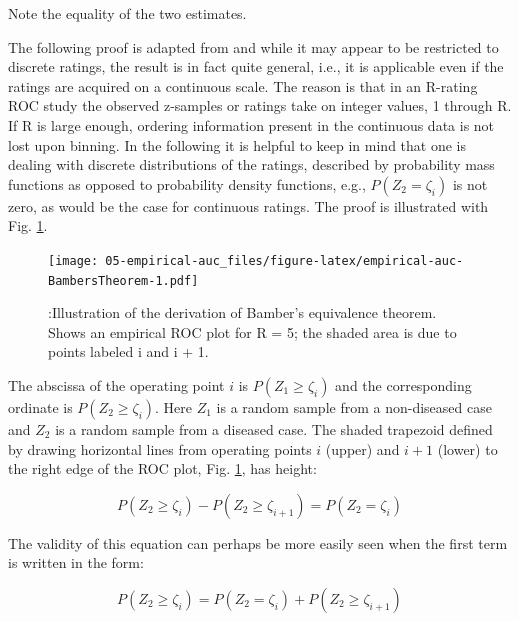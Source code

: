 \documentclass[
]{book}
\begin{document}
Note the equality of the two estimates.

The following proof is adapted from \citep{RN2174} and while it may appear to be restricted to discrete ratings, the result is in fact quite general, i.e., it is applicable even if the ratings are acquired on a continuous scale. The reason is that in an R-rating ROC study the observed z-samples or ratings take on integer values, 1 through R. If R is large enough, ordering information present in the continuous data is not lost upon binning. In the following it is helpful to keep in mind that one is dealing with discrete distributions of the ratings, described by probability mass functions as opposed to probability density functions, e.g., \(P(Z_2 = \zeta_i)\) is not zero, as would be the case for continuous ratings. The proof is illustrated with Fig. \ref{fig:empirical-auc-BambersTheorem}.

\begin{figure}
\centering
\texttt{[image: 05-empirical-auc\_files/figure-latex/empirical-auc-BambersTheorem-1.pdf]}
\caption{\label{fig:empirical-auc-BambersTheorem}:Illustration of the derivation of Bamber's equivalence theorem. Shows an empirical ROC plot for R = 5; the shaded area is due to points labeled i and i + 1.}
\end{figure}

The abscissa of the operating point \(i\) is \(P(Z_1 \geq \zeta_i)\) and the corresponding ordinate is \(P(Z_2 \geq \zeta_i)\). Here \(Z_1\) is a random sample from a non-diseased case and \(Z_2\) is a random sample from a diseased case. The shaded trapezoid defined by drawing horizontal lines from operating points \(i\) (upper) and \(i+1\) (lower) to the right edge of the ROC plot, Fig. \ref{fig:empirical-auc-BambersTheorem}, has height:

\begin{equation}
P\left ( Z_2 \geq \zeta_i \right ) - P\left ( Z_2 \geq \zeta_{i+1} \right ) = P\left ( Z_2 = \zeta_i \right )
\label{eq:empirical-auc-BambersTheoremProof1}
\end{equation}

The validity of this equation can perhaps be more easily seen when the first term is written in the form:

\begin{equation}
P\left ( Z_2 \geq \zeta_i \right ) = P\left ( Z_2 = \zeta_i \right )  + P\left ( Z_2 \geq \zeta_{i+1} \right )
\label{eq:empirical-auc-BambersTheoremProof2}
\end{equation}
\end{document}
